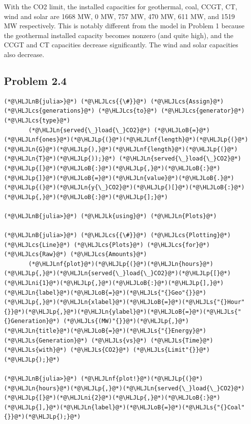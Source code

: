 \documentclass[12pt,a4paper]{article}
\newcommand{\HLJLk}[1]{\textcolor[RGB]{148,91,176}{\textbf{#1}}}
\newcommand{\HLJLn}[1]{#1}
\newcommand{\HLJLnf}[1]{\textcolor[RGB]{66,102,213}{#1}}
\newcommand{\HLJLs}[1]{\textcolor[RGB]{201,61,57}{#1}}
\newcommand{\HLJLnB}[1]{\textcolor[RGB]{59,151,46}{#1}}
\newcommand{\HLJLni}[1]{\textcolor[RGB]{59,151,46}{#1}}
\newcommand{\HLJLoB}[1]{\textcolor[RGB]{102,102,102}{\textbf{#1}}}
\newcommand{\HLJLp}[1]{#1}
\newcommand{\HLJLcs}[1]{\textcolor[RGB]{153,153,119}{\textit{#1}}}
\begin{document}
With the CO2 limit, the installed capacities for geothermal, coal, CCGT, CT, wind and solar are  1668 MW, 0 MW, 757 MW, 470 MW, 611 MW, and 1519 MW respectively. This is notably different from the model in Problem 1 because the geothermal installed capacity becomes nonzero (and quite high), and the CCGT and CT capacities decrease  significantly. The wind and solar capacities also decrease.

\subsection{Problem 2.4}

\begin{lstlisting}
(*@\HLJLnB{julia>}@*) (*@\HLJLcs{{\#}}@*) (*@\HLJLcs{Assign}@*) (*@\HLJLcs{generations}@*) (*@\HLJLcs{to}@*) (*@\HLJLcs{generator}@*) (*@\HLJLcs{type}@*)
       (*@\HLJLn{served{\_}load{\_}CO2}@*) (*@\HLJLoB{=}@*) (*@\HLJLnf{ones}@*)(*@\HLJLp{(}@*)(*@\HLJLnf{length}@*)(*@\HLJLp{(}@*)(*@\HLJLn{G}@*)(*@\HLJLp{),}@*)(*@\HLJLnf{length}@*)(*@\HLJLp{(}@*)(*@\HLJLn{T}@*)(*@\HLJLp{));}@*) (*@\HLJLn{served{\_}load{\_}CO2}@*)(*@\HLJLp{[}@*)(*@\HLJLoB{:}@*)(*@\HLJLp{,}@*)(*@\HLJLoB{:}@*)(*@\HLJLp{]}@*)(*@\HLJLoB{=}@*)(*@\HLJLn{value}@*)(*@\HLJLoB{.}@*)(*@\HLJLp{(}@*)(*@\HLJLn{y{\_}CO2}@*)(*@\HLJLp{)[}@*)(*@\HLJLoB{:}@*)(*@\HLJLp{,}@*)(*@\HLJLoB{:}@*)(*@\HLJLp{];}@*)

(*@\HLJLnB{julia>}@*) (*@\HLJLk{using}@*) (*@\HLJLn{Plots}@*)

(*@\HLJLnB{julia>}@*) (*@\HLJLcs{{\#}}@*) (*@\HLJLcs{Plotting}@*) (*@\HLJLcs{Line}@*) (*@\HLJLcs{Plots}@*) (*@\HLJLcs{for}@*) (*@\HLJLcs{Raw}@*) (*@\HLJLcs{Amounts}@*)
       (*@\HLJLnf{plot}@*)(*@\HLJLp{(}@*)(*@\HLJLn{hours}@*)(*@\HLJLp{,}@*)(*@\HLJLn{served{\_}load{\_}CO2}@*)(*@\HLJLp{[}@*)(*@\HLJLni{1}@*)(*@\HLJLp{,}@*)(*@\HLJLoB{:}@*)(*@\HLJLp{],}@*)(*@\HLJLn{label}@*)(*@\HLJLoB{=}@*)(*@\HLJLs{"{}Geo"{}}@*)(*@\HLJLp{,}@*)(*@\HLJLn{xlabel}@*)(*@\HLJLoB{=}@*)(*@\HLJLs{"{}Hour"{}}@*)(*@\HLJLp{,}@*)(*@\HLJLn{ylabel}@*)(*@\HLJLoB{=}@*)(*@\HLJLs{"{}Generation}@*) (*@\HLJLs{(MW)"{}}@*)(*@\HLJLp{,}@*)(*@\HLJLn{title}@*)(*@\HLJLoB{=}@*)(*@\HLJLs{"{}Energy}@*) (*@\HLJLs{Generation}@*) (*@\HLJLs{vs}@*) (*@\HLJLs{Time}@*) (*@\HLJLs{with}@*) (*@\HLJLs{CO2}@*) (*@\HLJLs{Limit"{}}@*)(*@\HLJLp{);}@*)

(*@\HLJLnB{julia>}@*) (*@\HLJLnf{plot!}@*)(*@\HLJLp{(}@*)(*@\HLJLn{hours}@*)(*@\HLJLp{,}@*)(*@\HLJLn{served{\_}load{\_}CO2}@*)(*@\HLJLp{[}@*)(*@\HLJLni{2}@*)(*@\HLJLp{,}@*)(*@\HLJLoB{:}@*)(*@\HLJLp{],}@*)(*@\HLJLn{label}@*)(*@\HLJLoB{=}@*)(*@\HLJLs{"{}Coal"{}}@*)(*@\HLJLp{);}@*)


\end{lstlisting}
\end{document}

